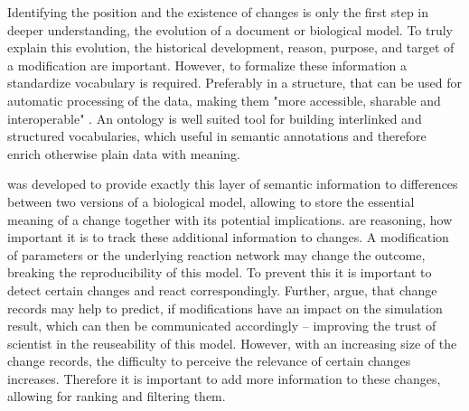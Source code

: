 	Identifying the position and the existence of changes is only the first step in deeper understanding, the evolution of a document or biological model. To truly explain this evolution, the historical development, reason, purpose, and target of a modification are important. 
	However, to formalize these information a standardize vocabulary is required. Preferably in a structure, that can be used for automatic processing of the data, making them "more accessible, sharable and interoperable" \citep{Scharm2016}.
	An ontology is well suited tool for building interlinked and structured vocabularies, which useful in semantic annotations and therefore enrich otherwise plain data with meaning.
	
	\comodi was developed to provide exactly this layer of semantic information to differences between two versions of a biological model, allowing to store the essential meaning of a change together with its potential implications.
	\citeauthor{Scharm2016} are reasoning, how important it is to track these additional information to changes. A modification of parameters or the underlying reaction network may change the outcome, breaking the reproducibility of this model. To prevent this it is important to detect certain changes and 
	react correspondingly.
	Further, \citeauthor{Scharm2016} argue, that change records may help to predict, if modifications have an impact on the simulation result, which can then be communicated accordingly -- improving the trust of scientist in the reuseability of this model.
	However, with an increasing size of the change records, the difficulty to perceive the relevance of certain changes increases. Therefore it is important to add more information to these changes, allowing for ranking and filtering them.
	
